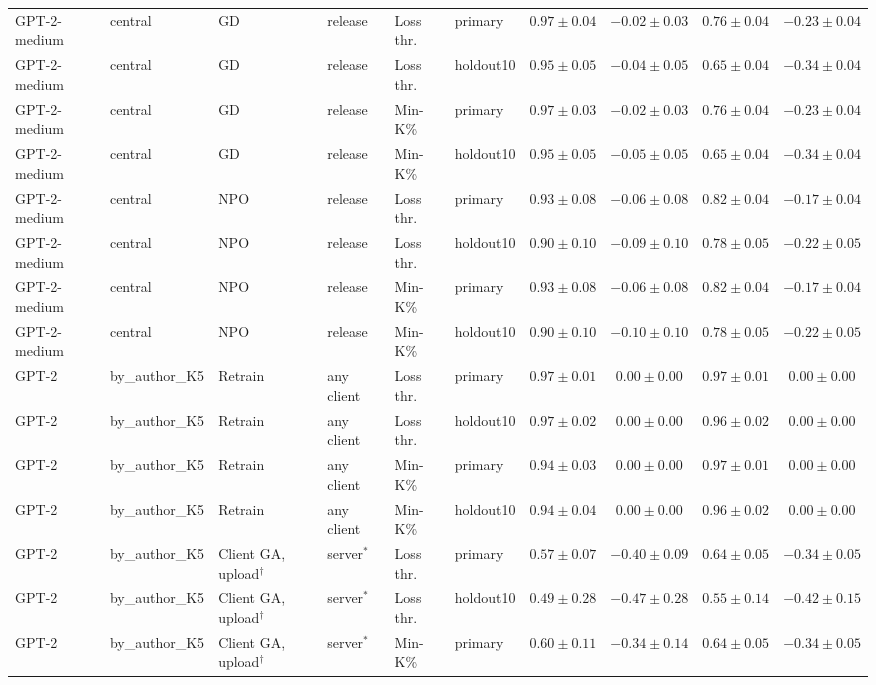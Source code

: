 \begin{table}[t]
\begin{tabular*}{\textwidth}{@{\extracolsep{\fill}}llllllcccc@{}}
GPT-2-medium & central & GD & release & Loss thr. & primary & $0.97 \pm 0.04$ & $-0.02 \pm 0.03$ & $0.76 \pm 0.04$ & $-0.23 \pm 0.04$ \\
GPT-2-medium & central & GD & release & Loss thr. & holdout10 & $0.95 \pm 0.05$ & $-0.04 \pm 0.05$ & $0.65 \pm 0.04$ & $-0.34 \pm 0.04$ \\
GPT-2-medium & central & GD & release & Min-K\% & primary & $0.97 \pm 0.03$ & $-0.02 \pm 0.03$ & $0.76 \pm 0.04$ & $-0.23 \pm 0.04$ \\
GPT-2-medium & central & GD & release & Min-K\% & holdout10 & $0.95 \pm 0.05$ & $-0.05 \pm 0.05$ & $0.65 \pm 0.04$ & $-0.34 \pm 0.04$ \\
GPT-2-medium & central & NPO & release & Loss thr. & primary & $0.93 \pm 0.08$ & $-0.06 \pm 0.08$ & $0.82 \pm 0.04$ & $-0.17 \pm 0.04$ \\
GPT-2-medium & central & NPO & release & Loss thr. & holdout10 & $0.90 \pm 0.10$ & $-0.09 \pm 0.10$ & $0.78 \pm 0.05$ & $-0.22 \pm 0.05$ \\
GPT-2-medium & central & NPO & release & Min-K\% & primary & $0.93 \pm 0.08$ & $-0.06 \pm 0.08$ & $0.82 \pm 0.04$ & $-0.17 \pm 0.04$ \\
GPT-2-medium & central & NPO & release & Min-K\% & holdout10 & $0.90 \pm 0.10$ & $-0.10 \pm 0.10$ & $0.78 \pm 0.05$ & $-0.22 \pm 0.05$ \\
GPT-2 & by\_author\_K5 & Retrain & any client & Loss thr. & primary & $0.97 \pm 0.01$ & $0.00 \pm 0.00$ & $0.97 \pm 0.01$ & $0.00 \pm 0.00$ \\
GPT-2 & by\_author\_K5 & Retrain & any client & Loss thr. & holdout10 & $0.97 \pm 0.02$ & $0.00 \pm 0.00$ & $0.96 \pm 0.02$ & $0.00 \pm 0.00$ \\
GPT-2 & by\_author\_K5 & Retrain & any client & Min-K\% & primary & $0.94 \pm 0.03$ & $0.00 \pm 0.00$ & $0.97 \pm 0.01$ & $0.00 \pm 0.00$ \\
GPT-2 & by\_author\_K5 & Retrain & any client & Min-K\% & holdout10 & $0.94 \pm 0.04$ & $0.00 \pm 0.00$ & $0.96 \pm 0.02$ & $0.00 \pm 0.00$ \\
GPT-2 & by\_author\_K5 & Client GA, upload$^{\dagger}$ & server$^{*}$ & Loss thr. & primary & $0.57 \pm 0.07$ & $-0.40 \pm 0.09$ & $0.64 \pm 0.05$ & $-0.34 \pm 0.05$ \\
GPT-2 & by\_author\_K5 & Client GA, upload$^{\dagger}$ & server$^{*}$ & Loss thr. & holdout10 & $0.49 \pm 0.28$ & $-0.47 \pm 0.28$ & $0.55 \pm 0.14$ & $-0.42 \pm 0.15$ \\
GPT-2 & by\_author\_K5 & Client GA, upload$^{\dagger}$ & server$^{*}$ & Min-K\% & primary & $0.60 \pm 0.11$ & $-0.34 \pm 0.14$ & $0.64 \pm 0.05$ & $-0.34 \pm 0.05$ \\

\end{tabular*}
\end{table}
